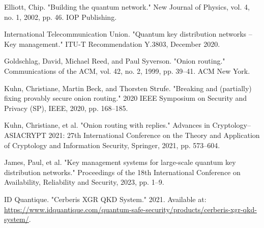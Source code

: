 \documentclass[conference]{IEEEtran}
\begin{document}
\begin{thebibliography}{00}
 Elliott, Chip. "Building the quantum network." New Journal of Physics, vol. 4, no. 1, 2002, pp. 46. IOP Publishing.

 International Telecommunication Union. "Quantum key distribution networks – Key management." ITU-T Recommendation Y.3803, December 2020.

 Goldschlag, David, Michael Reed, and Paul Syverson. "Onion routing." Communications of the ACM, vol. 42, no. 2, 1999, pp. 39–41. ACM New York.

 Kuhn, Christiane, Martin Beck, and Thorsten Strufe. "Breaking and (partially) fixing provably secure onion routing." 2020 IEEE Symposium on Security and Privacy (SP), IEEE, 2020, pp. 168–185.

 Kuhn, Christiane, et al. "Onion routing with replies." Advances in Cryptology--ASIACRYPT 2021: 27th International Conference on the Theory and Application of Cryptology and Information Security, Springer, 2021, pp. 573–604.

 James, Paul, et al. "Key management systems for large-scale quantum key distribution networks." Proceedings of the 18th International Conference on Availability, Reliability and Security, 2023, pp. 1–9.

 ID Quantique. "Cerberis XGR QKD System." 2021. Available at: \url{https://www.idquantique.com/quantum-safe-security/products/cerberis-xgr-qkd-system/}.

\end{thebibliography}
\end{document}

